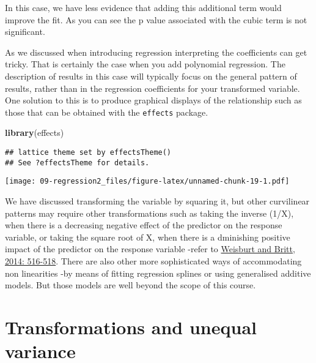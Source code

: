 \documentclass[
]{book}
\newenvironment{Shaded}{\begin{snugshade}}{\end{snugshade}}
\newcommand{\FunctionTok}[1]{\textcolor[rgb]{0.13,0.29,0.53}{\textbf{#1}}}
\newcommand{\NormalTok}[1]{#1}
\newcommand{\SpecialCharTok}[1]{\textcolor[rgb]{0.81,0.36,0.00}{\textbf{#1}}}
\begin{document}
In this case, we have less evidence that adding this additional term would improve the fit. As you can see the p value associated with the cubic term is not significant.

As we discussed when introducing regression interpreting the coefficients can get tricky. That is certainly the case when you add polynomial regression. The description of results in this case will typically focus on the general pattern of results, rather than in the regression coefficients for your transformed variable. One solution to this is to produce graphical displays of the relationship such as those that can be obtained with the \texttt{effects} package.

\begin{Shaded}
\begin{Highlighting}[]
\FunctionTok{library}\NormalTok{(effects)}
\end{Highlighting}
\end{Shaded}

\begin{verbatim}
## lattice theme set by effectsTheme()
## See ?effectsTheme for details.
\end{verbatim}

\begin{Shaded}
\end{Shaded}

\texttt{[image: 09-regression2\_files/figure-latex/unnamed-chunk-19-1.pdf]}

We have discussed transforming the variable by squaring it, but other curvilinear patterns may require other transformations such as taking the inverse (1/X), when there is a decreasing negative effect of the predictor on the response variable, or taking the square root of X, when there is a dminishing positive impact of the predictor on the response variable -refer to \href{http://link.springer.com/book/10.1007\%2F978-1-4614-9170-5}{Weisburt and Britt, 2014: 516-518}. There are also other more sophisticated ways of accommodating non linearities -by means of fitting regression splines or using generalised additive models. But those models are well beyond the scope of this course.

\section{Transformations and unequal variance}\label{transformations-and-unequal-variance}
\end{document}
